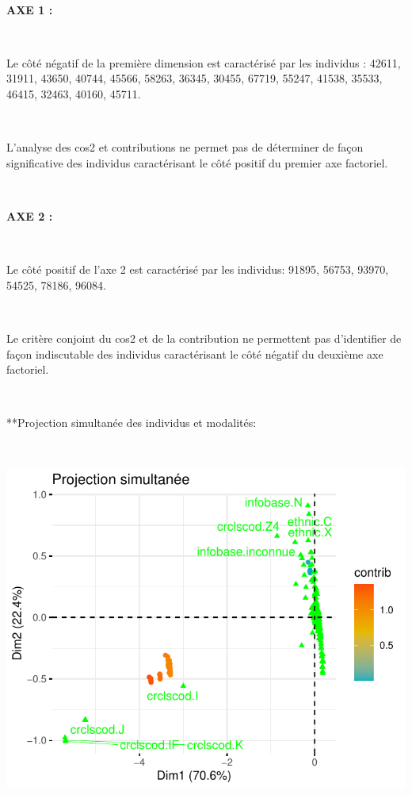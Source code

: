 \documentclass[]{imsart}
\numberwithin{equation}{section}
\theoremstyle{plain}
\begin{document}
~

\textbf{AXE 1 :}

~

Le côté négatif de la première dimension est caractérisé par les individus : 42611, 31911, 43650, 40744, 45566, 58263, 36345, 30455, 67719, 55247, 41538, 35533, 46415, 32463, 40160, 45711.

~

L'analyse des cos2 et contributions ne permet pas de déterminer de façon significative des individus caractérisant le côté positif du premier axe factoriel.

~

\textbf{AXE 2 :}

~

Le côté positif de l'axe 2 est caractérisé par les individus: 91895, 56753, 93970, 54525, 78186, 96084.

~

Le critère conjoint du cos2 et de la contribution ne permettent pas d'identifier de façon indiscutable des individus caractérisant le côté négatif du deuxième axe factoriel.

~

**Projection simultanée des individus et modalités:

~

\begin{flushleft}\includegraphics{Analyse_Exploratoire_Projet_files/figure-latex/unnamed-chunk-35-1} \end{flushleft}

~
\end{document}
